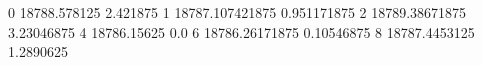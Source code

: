 0 18788.578125 2.421875
1 18787.107421875 0.951171875
2 18789.38671875 3.23046875
4 18786.15625 0.0
6 18786.26171875 0.10546875
8 18787.4453125 1.2890625
